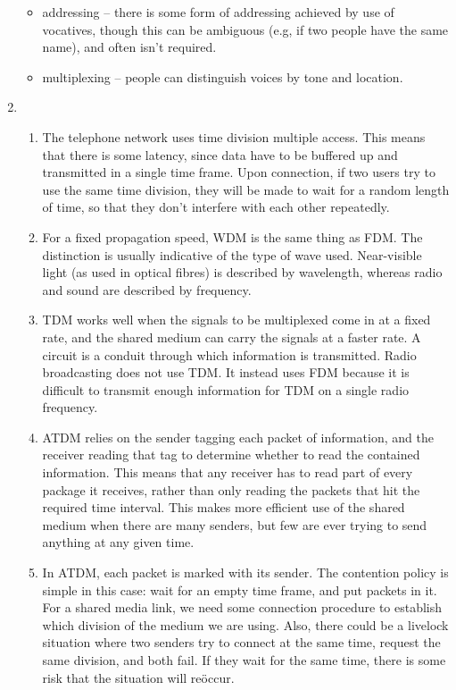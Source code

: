 \documentclass{article}
\begin{document}
\begin{enumerate}
\begin{itemize}
      \item addressing -- there is some form of addressing achieved by use of vocatives, though this can be ambiguous (e.g, if two people have the same name), and often isn't required.
      \item multiplexing -- people can distinguish voices by tone and location.
    \end{itemize}
  \item
    \begin{enumerate}
      \item The telephone network uses time division multiple access. This means that there is some latency, since data have to be buffered up and transmitted in a single time frame. Upon connection, if two users try to use the same time division, they will be made to wait for a random length of time, so that they don't interfere with each other repeatedly.
      \item For a fixed propagation speed, WDM is the same thing as FDM. The distinction is usually indicative of the type of wave used. Near-visible light (as used in optical fibres) is described by wavelength, whereas radio and sound are described by frequency.
      \item TDM works well when the signals to be multiplexed come in at a fixed rate, and the shared medium can carry the signals at a faster rate. A circuit is a conduit through which information is transmitted. Radio broadcasting does not use TDM. It instead uses FDM because it is difficult to transmit enough information for TDM on a single radio frequency.
      \item ATDM relies on the sender tagging each packet of information, and the receiver reading that tag to determine whether to read the contained information. This means that any receiver has to read part of every package it receives, rather than only reading the packets that hit the required time interval. This makes more efficient use of the shared medium when there are many senders, but few are ever trying to send anything at any given time.
      \item In ATDM, each packet is marked with its sender. The contention policy is simple in this case: wait for an empty time frame, and put packets in it. For a shared media link, we need some connection procedure to establish which division of the medium we are using. Also, there could be a livelock situation where two senders try to connect at the same time, request the same division, and both fail. If they wait for the same time, there is some risk that the situation will re\"occur.

\end{enumerate}
\end{enumerate}
\end{document}
